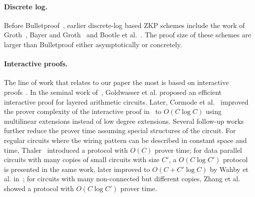 \paragraph{Discrete log.} Before Bulletproof~\cite{bulletproofs}, earlier discrete-log based ZKP schemes include the work of Groth~\cite{groth2009linear}, Bayer and Groth~\cite{bayer2012efficient} and Bootle et al.~\cite{bootle2016efficient,bootle2017linear}. The proof size of these schemes are larger than Bulletproof either asymptotically or concretely.




\paragraph{Interactive proofs.} The line of work that relates to our paper the most is based on interactive proofs~\cite{goldwasser1989knowledge}. In the seminal work of~\cite{GKR}, Goldwasser et al. proposed an efficient interactive proof for layered arithmetic circuits. Later, Cormode et al.~\cite{CMT} improved the prover complexity of the interactive proof in~\cite{GKR} to $O(C\log C)$ using multilinear extensions instead of low degree extensions. Several follow-up works further reduce the prover time assuming special structures of the circuit. For regular circuits where the wiring pattern can be described in constant space and time, Thaler~\cite{JT_Thesis} introduced a protocol with $O(C)$ prover time; for data parallel circuits with many copies of small circuits with size $C'$, a $O(C\log C')$ protocol is presented in the same work, later improved to $O(C+C'\log C)$ by Wahby et al. in~\cite{wahby2017full}; for circuits with many non-connected but different copies, Zhang et al. showed a protocol with $O(C\log C')$ prover time.

